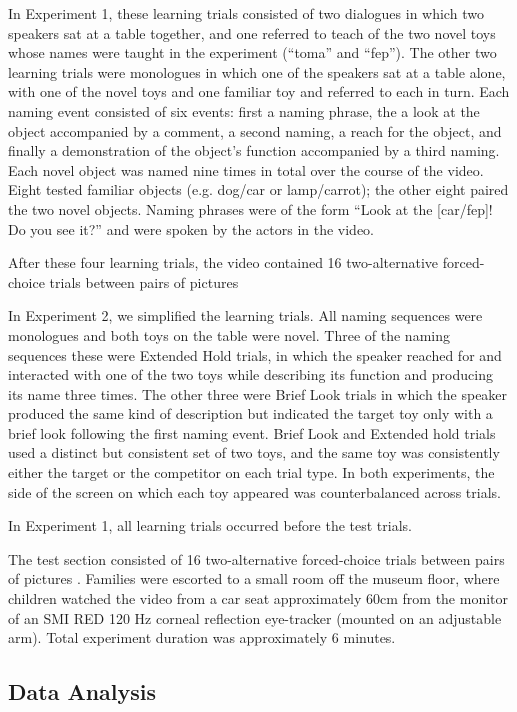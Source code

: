 \documentclass{pnastwo}
\begin{document}
\begin{article}
\begin{materials}
In Experiment 1, these learning trials consisted of two dialogues in which two speakers sat at a table together, and one referred to teach of the two novel toys whose names were taught in the experiment (``toma'' and ``fep''). The other two learning trials were monologues in which one of the speakers sat at a table alone, with one of the novel toys and one familiar toy and referred to each in turn. Each naming event consisted of six events: first a naming phrase, the a look at the object accompanied by a comment, a second naming, a reach for the object, and finally a demonstration of the object's function accompanied by a third naming. Each novel object was named nine times in total over the course of the video. Eight tested familiar objects (e.g. dog/car or lamp/carrot); the other eight paired the two novel objects. Naming phrases were of the form ``Look at the [car/fep]! Do you see it?'' and were spoken by the actors in the video.

After these four learning trials, the video contained 16 two-alternative forced-choice trials between pairs of pictures 

In Experiment 2, we simplified the learning trials. All naming sequences were monologues and both toys on the table were novel. Three of the naming sequences these were Extended Hold trials, in which the speaker reached for and interacted with one of the two toys while describing its function and producing its name three times. The other three were Brief Look trials in which the speaker produced the same kind of description but indicated the target toy only with a brief look following the first naming event. Brief Look and Extended hold trials used a distinct but consistent set of two toys, and the same toy was consistently either the target or the competitor on each trial type. In both experiments, the side of the screen on which each toy appeared was counterbalanced across trials.



In Experiment 1, all learning trials occurred before the test trials. 

The test section consisted of 16 two-alternative forced-choice trials between pairs of pictures  \cite{fernald2008}. 
Families were escorted to a small room off the museum floor, where children watched the video from a car seat approximately 60cm from the monitor of an SMI RED 120 Hz corneal reflection eye-tracker (mounted on an adjustable arm). Total experiment duration was approximately 6 minutes. 

\subsection{Data Analysis}


\end{materials}
\end{article}
\end{document}
